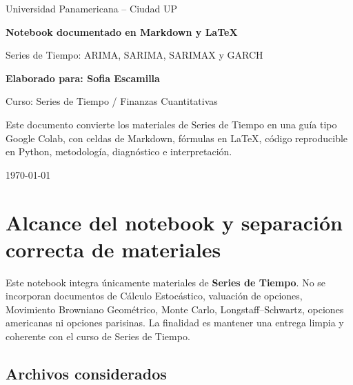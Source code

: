 \documentclass[11pt,letterpaper]{article}
\begin{document}
\begin{titlepage}
    \centering
    \vspace*{1.0cm}
    {\Large Universidad Panamericana -- Ciudad UP\par}
    \vspace{0.8cm}
    {\Huge\bfseries Notebook documentado en Markdown y \LaTeX\par}
    \vspace{0.35cm}
    {\LARGE Series de Tiempo: ARIMA, SARIMA, SARIMAX y GARCH\par}
    \vspace{1.0cm}
    {\Large \textbf{Elaborado para: Sofia Escamilla}\par}
    \vspace{0.25cm}
    {\large Curso: Series de Tiempo / Finanzas Cuantitativas\par}
    \vfill
    \begin{tcolorbox}[colback=azulClaro,colframe=azulUP,width=0.86\textwidth]
    \centering
    Este documento convierte los materiales de Series de Tiempo en una guía tipo Google Colab, con celdas de Markdown, fórmulas en \LaTeX, código reproducible en Python, metodología, diagnóstico e interpretación.
    \end{tcolorbox}
    \vfill
    {\large \today\par}
\end{titlepage}

\tableofcontents
\newpage
\listoftables
\newpage
{}

\section{Alcance del notebook y separación correcta de materiales}

\begin{markdowncell}
Este notebook integra únicamente materiales de \textbf{Series de Tiempo}. No se incorporan documentos de Cálculo Estocástico, valuación de opciones, Movimiento Browniano Geométrico, Monte Carlo, Longstaff--Schwartz, opciones americanas ni opciones parisinas. La finalidad es mantener una entrega limpia y coherente con el curso de Series de Tiempo.
\end{markdowncell}

\subsection{Archivos considerados}
\end{document}
